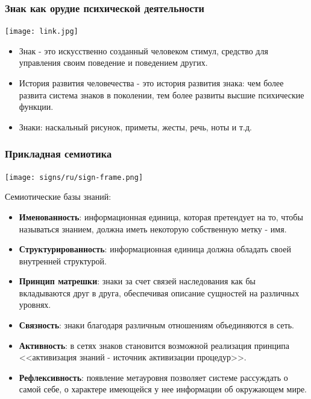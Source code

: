 	\begin{frame}
		\frametitle{Знак как орудие психической деятельности}
		\begin{center}
			\texttt{[image: link.jpg]}
		\end{center}

		\begin{itemize}
			\item Знак - это искусственно созданный человеком стимул, средство для управления своим поведение и поведением других.
			\item История развития человечества - это история развития знака: чем более развита система знаков в поколении, тем более развиты высшие психические функции.
			\item Знаки: наскальный рисунок, приметы, жесты, речь, ноты и т.д.
		\end{itemize}
	\end{frame}

	\begin{frame}
		\frametitle{Прикладная семиотика}
		\begin{center}
			\texttt{[image: signs/ru/sign-frame.png]}
		\end{center}
		\vspace{-15pt}
		\scriptsize
		Семиотические базы знаний:
		\begin{itemize}
			\item \textbf{Именованность}: информационная единица, которая претендует на то, чтобы называться знанием, должна иметь некоторую собственную метку - имя.
			\item \textbf{Структурированность}: информационная единица должна обладать своей внутренней структурой.
			\item \textbf{Принцип матрешки}: знаки за счет связей наследования как бы вкладываются друг в друга, обеспечивая описание сущностей на различных уровнях.
			\item \textbf{Связность}: знаки благодаря различным отношениям объединяются в сеть.
			\item \textbf{Активность}: в сетях знаков становится возможной реализация принципа <<активизация знаний - источник активизации процедур>>.
			\item \textbf{Рефлексивность}: появление метауровня позволяет системе рассуждать о самой себе, о характере имеющейся у нее информации об окружающем мире.
		\end{itemize}
		\vspace{-5pt}
		\nocite{*}
		\printbibliography[keyword={apply}, resetnumbers=true]
	\end{frame}

